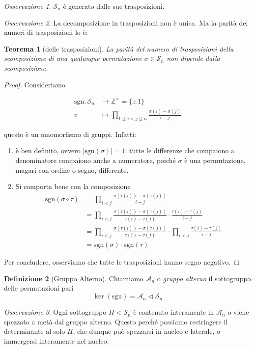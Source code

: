 \documentclass[a4paper]{article}
\newtheorem{theorem}{Teorema}[section]
\theoremstyle{remark}
\newtheorem*{remark}{Osservazione}
\theoremstyle{definition}
\newtheorem{definition}[theorem]{Definizione}
\newcommand{\fun}[5]{
	\begin{align*}
	#1 \colon #2 &\to #3 \\
	#4 &\mapsto #5
	\end{align*}
}
\begin{document}
\begin{multicols}{2}
\begin{remark}
	$ \mathcal{S}_n $ è generato dalle sue trasposizioni.
\end{remark}
\begin{remark}
	La decomposizione in trasposizioni non è unica. Ma la parità del numeri di trasposizioni lo è:
\end{remark}
\begin{theorem}[delle trasposizioni]
	La parità del numero di trasposizioni della scomposizione di una qualunque permutazione $ \sigma \in \mathcal{S}_n $ non dipende dalla scomposizione.
\end{theorem}
\begin{proof}
	Consideriamo
	\fun{\text{sgn}}{\mathcal{S}_n}{\mathbb{Z}^\times = \{\pm 1\}}{\sigma}{\prod_{1 \leq i < j \leq n}\frac{\sigma(i)-\sigma(j)}{i-j}}
	questo è un omomorfismo di gruppi. Infatti:
	\begin{enumerate}
		\item è ben definito, ovvero $ |\text{sgn}(\sigma)| = 1 $: tutte le differenze che compaiono a denominatore compaiono anche a numeratore, poiché $ \sigma $ è una permutazione, magari con ordine o segno, differente.
		\item Si comporta bene con la composizione
		\begin{align*}
			\text{sgn}(\sigma \circ \tau) &= \prod_{i < j}\frac{\sigma(\tau(i))-\sigma(\tau(j))}{i-j} \\
			& = \prod_{i < j}\frac{\sigma(\tau(i))-\sigma(\tau(j))}{\tau(i)-\tau(j)}\cdot \frac{\tau(i)-\tau(j)}{i-j} \\
			& = \prod_{i < j}\frac{\sigma(\tau(i))-\sigma(\tau(j))}{\tau(i)-\tau(j)}\cdot\prod_{i < j} \frac{\tau(i)-\tau(j)}{i-j}\\
			& = \text{sgn}(\sigma)\cdot \text{sgn}(\tau)
		\end{align*}
	\end{enumerate}
	Per concludere, osserviamo che tutte le trasposizioni hanno segno negativo. 
\end{proof}
\begin{definition}[Gruppo Alterno]
	Chiamiamo $ \mathcal{A}_n $ o \emph{gruppo alterno} il sottogruppo delle permutazioni pari
	\[ \ker(\text{sgn}) = \mathcal{A}_n \lhd \mathcal{S}_n \]
\end{definition}
\begin{remark}
	Ogni sottogruppo $ H < \mathcal{S}_n $ è contenuto interamente in $ \mathcal{A}_n $ o viene spezzato a metà dal gruppo alterno. Questo perché possiamo restringere il determinante al solo $ H $, che dunque può spezzarsi in nucleo e laterale, o immergersi interamente nel nucleo.
\end{remark}


\end{multicols}
\end{document}
